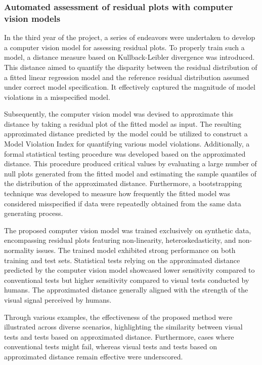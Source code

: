 \documentclass[11pt,a4paper,]{article}
\begin{document}
\hypertarget{automated-assessment-of-residual-plots-with-computer-vision-models}{%
\subsubsection{Automated assessment of residual plots with computer vision models}\label{automated-assessment-of-residual-plots-with-computer-vision-models}}

In the third year of the project, a series of endeavors were undertaken to develop a computer vision model for assessing residual plots. To properly train such a model, a distance measure based on Kullback-Leibler divergence was introduced. This distance aimed to quantify the disparity between the residual distribution of a fitted linear regression model and the reference residual distribution assumed under correct model specification. It effectively captured the magnitude of model violations in a misspecified model.

Subsequently, the computer vision model was devised to approximate this distance by taking a residual plot of the fitted model as input. The resulting approximated distance predicted by the model could be utilized to construct a Model Violation Index for quantifying various model violations. Additionally, a formal statistical testing procedure was developed based on the approximated distance. This procedure produced critical values by evaluating a large number of null plots generated from the fitted model and estimating the sample quantiles of the distribution of the approximated distance. Furthermore, a bootstrapping technique was developed to measure how frequently the fitted model was considered misspecified if data were repeatedly obtained from the same data generating process.

The proposed computer vision model was trained exclusively on synthetic data, encompassing residual plots featuring non-linearity, heteroskedasticity, and non-normality issues. The trained model exhibited strong performance on both training and test sets. Statistical tests relying on the approximated distance predicted by the computer vision model showcased lower sensitivity compared to conventional tests but higher sensitivity compared to visual tests conducted by humans. The approximated distance generally aligned with the strength of the visual signal perceived by humans.

Through various examples, the effectiveness of the proposed method were illustrated across diverse scenarios, highlighting the similarity between visual tests and tests based on approximated distance. Furthermore, cases where conventional tests might fail, whereas visual tests and tests based on approximated distance remain effective were underscored.
\end{document}
